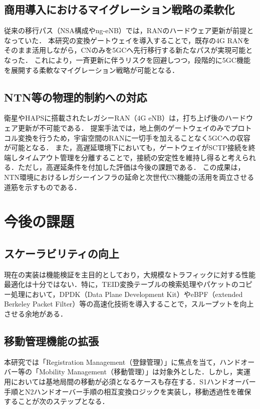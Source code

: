 \subsection{商用導入におけるマイグレーション戦略の柔軟化}
従来の移行パス（NSA構成やng-eNB）では，RANのハードウェア更新が前提となっていた．
本研究の変換ゲートウェイを導入することで，既存の4G RANをそのまま活用しながら，CNのみを5GCへ先行移行する新たなパスが実現可能となった．
これにより，一斉更新に伴うリスクを回避しつつ，段階的に5GC機能を展開する柔軟なマイグレーション戦略が可能となる．

\subsection{NTN等の物理的制約への対応}
衛星やHAPSに搭載されたレガシーRAN（4G eNB）は，打ち上げ後のハードウェア更新が不可能である．
提案手法では，地上側のゲートウェイのみでプロトコル変換を行うため，宇宙空間のRANに一切手を加えることなく5GCへの収容が可能となる．
また，高遅延環境下においても，ゲートウェイがSCTP接続を終端しタイムアウト管理を分離することで，接続の安定性を維持し得ると考えられる．ただし，高遅延条件を付加した評価は今後の課題である．
この成果は，NTN環境におけるレガシーインフラの延命と次世代CN機能の活用を両立させる道筋を示すものである．

\section{今後の課題}

\subsection{スケーラビリティの向上}
現在の実装は機能検証を主目的としており，大規模なトラフィックに対する性能最適化は十分ではない．特に，TEID変換テーブルの検索処理やパケットのコピー処理において，DPDK（Data Plane Development Kit）やeBPF（extended Berkeley Packet Filter）等の高速化技術を導入することで，スループットを向上させる余地がある．

\subsection{移動管理機能の拡張}
本研究では「Registration Management（登録管理）」に焦点を当て，ハンドオーバー等の「Mobility Management（移動管理）」は対象外とした．しかし，実運用においては基地局間の移動が必須となるケースも存在する．S1ハンドオーバー手順とN2ハンドオーバー手順の相互変換ロジックを実装し，移動透過性を確保することが次のステップとなる．

